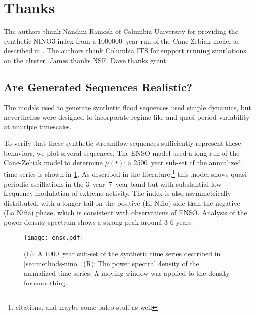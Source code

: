 \documentclass[12pt]{article}
\begin{document}

\appendix

\section{Thanks}

The authors thank Nandini Ramesh of Columbia University for providing the synthetic NINO3 index from a \SI{1000000}{year} run of the Cane-Zebiak model as described in \citet{Ramesh2017}.
The authors thank Columbia ITS for support running simulations on the cluster.
James thanks NSF.
Dave thanks grant.

\subsection{Are Generated Sequences Realistic?\label{sec:sequence-realistic}}

The models used to generate synthetic flood sequences used simple dynamics, but nevertheless were designed to incorporate regime-like and quasi-period variability at multiple timescales.

To verify that these synthetic streamflow sequences sufficiently represent these behaviors, we plot several sequences.
The ENSO model used a long run of the Cane-Zebiak model \citep{Zebiak1987,Ramesh2017} to determine \(\mu(t)\); a \SI{2500}{year} sub-set of the annualized time series is shown in \cref{fig:enso-ts}.
As described in the literature,\footnote{citations, and maybe some paleo stuff as well} this model shows quasi-periodic oscillations in the \SIrange{3}{7}{year} band but with substantial low-frequency modulation of extreme activity.
The index is also asymmetrically distributed, with a longer tail on the positive (El Ni\~{n}o) side than the negative (La Ni\~{n}a) phase, which is consistent with observations of ENSO.
Analysis of the power density spectrum shows a strong peak around 3-6 years.
\begin{figure}
  \texttt{[image: enso.pdf]}
  \caption{
    (L): A \SI{1000}{year} sub-set of the synthetic time series described in \cref{sec:methods-nino}.
    (R): The power spectral density of the annualized time series. A moving window was applied to the density for smoothing.\label{fig:enso-ts}
  }
\end{figure}
\end{document}
